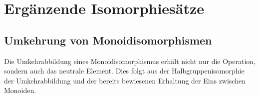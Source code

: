 \documentclass[main.tex]{subfiles}
\begin{document}
\begin{tabproof}
\end{tabproof}

\chapter{Ergänzende Isomorphiesätze}

\section{Umkehrung von Monoidisomorphismen}

Die Umkehrabbildung eines Monoidisomorphismus erhält nicht nur die
Operation, sondern auch das neutrale Element. Dies folgt aus der
Halbgruppenisomorphie der Umkehrabbildung und der bereits bewiesenen
Erhaltung der Eins zwischen Monoiden.
\end{document}
